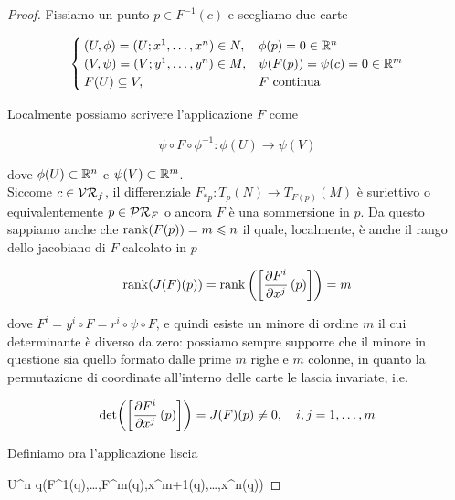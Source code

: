 \begin{proof}
	Fissiamo un punto $ p \in F^{-1}(c) $ e scegliamo due carte
	
	\begin{equation}
		\begin{cases}
			(U,\phi) = (U; x^{1},\dots,x^{n}) \in N, & \phi(p) = 0 \in \mathbb{R}^{n} \\
			(V,\psi) = (V; y^{1},\dots,y^{n}) \in M, & \psi(F(p)) = \psi(c) = 0 \in \mathbb{R}^{m} \\
			F(U) \subseteq V, & F \text{ continua}
		\end{cases}
	\end{equation}
	

	Localmente possiamo scrivere l'applicazione $ F $ come
	
	\begin{equation}
		\psi \circ F \circ \phi^{-1} : \phi(U) \to \psi(V)
	\end{equation}

	dove $ \phi(U) \subset \mathbb{R}^{n} $ e $ \psi(V) \subset \mathbb{R}^{m} $.\\
	Siccome $ c \in \mathcal{VR}_{f} $, il differenziale $ F_{*p} : T_{p}(N) \to T_{F(p)}(M) $ è suriettivo o equivalentemente $ p \in \mathcal{PR}_{F} $ o ancora $ F $ è una sommersione in $ p $. Da questo sappiamo anche che $ \rank(F(p)) = m \leqslant n $ il quale, localmente, è anche il rango dello jacobiano di $ F $ calcolato in $ p $
	
	\begin{equation}
		\rank(J(F)(p)) = \rank \left( \left[ \pdv{F^{i}}{x^{j}} \, (p) \right] \right) = m
	\end{equation}

	dove $ F^{i} = y^{i} \circ F = r^{i} \circ \psi \circ F $, e quindi esiste un minore di ordine $ m $ il cui determinante è diverso da zero: possiamo sempre supporre che il minore in questione sia quello formato dalle prime $ m $ righe e $ m $ colonne, in quanto la permutazione di coordinate all'interno delle carte le lascia invariate, i.e.
	
	\begin{equation}
		\det( \left[ \pdv{F^{i}}{x^{j}} \, (p) \right] ) = J(F)(p) \neq 0 \qcomma i,j=1,\dots,m
	\end{equation}

	Definiamo ora l'applicazione liscia
	
		{U}{\R^{n}}
		{q}{(F^{1}(q),\dots,F^{m}(q),x^{m+1}(q),\dots,x^{n}(q))}


\end{proof}
